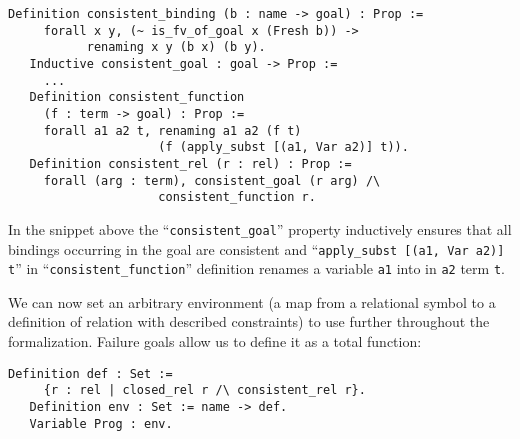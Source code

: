 \begin{lstlisting}[language=Coq]
   Definition consistent_binding (b : name -> goal) : Prop :=
     forall x y, (~ is_fv_of_goal x (Fresh b)) ->
           renaming x y (b x) (b y).
   Inductive consistent_goal : goal -> Prop :=
     ...
   Definition consistent_function
     (f : term -> goal) : Prop :=
     forall a1 a2 t, renaming a1 a2 (f t)
                     (f (apply_subst [(a1, Var a2)] t)).
   Definition consistent_rel (r : rel) : Prop :=
     forall (arg : term), consistent_goal (r arg) /\
                     consistent_function r.
\end{lstlisting}

In the snippet above the ``\lstinline[language=Coq]{consistent_goal}'' property inductively ensures that all bindings occurring
in the goal are consistent and ``\lstinline[language=Coq]{apply_subst [(a1, Var a2)] t}'' in ``\lstinline[language=Coq]{consistent_function}''
definition renames a variable \lstinline[language=Coq]{a1} into in \lstinline[language=Coq]{a2} term \lstinline[language=Coq]{t}.

We can now set an arbitrary environment (a map from a relational symbol to a definition of relation with described constraints) to use further throughout the formalization.
Failure goals allow us to define it as a total function:

\begin{lstlisting}[language=Coq]
   Definition def : Set := 
     {r : rel | closed_rel r /\ consistent_rel r}.
   Definition env : Set := name -> def.
   Variable Prog : env.
\end{lstlisting}
